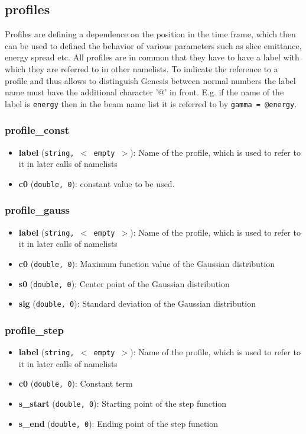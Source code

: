 \documentclass[12pt]{book}
\begin{document}
\subsection{\sf profiles}
Profiles are defining a dependence on the position in the time frame, which then can be used to defined the behavior of various parameters such as slice emittance, energy spread etc. All profiles are in common that they have to have a label with which they are referred to in other namelists. To indicate the reference to a profile and thus allows to distinguish Genesis between normal numbers the label name must have the additional character '@' in front. E.g. if the name of the label is {\tt energy} then in the beam name list it is referred to by {\tt gamma = @energy}.

\subsubsection{\sf profile\_const}
\begin{itemize}
\item{\bf label} ({\tt string, $<$ empty $>$}): Name of the profile, which is used to refer to it in later calls of namelists
\item{\bf c0} ({\tt double, 0}): constant value to be used.
\end{itemize}


\subsubsection{\sf profile\_gauss}
\begin{itemize}
\item{\bf label} ({\tt string, $<$ empty $>$}): Name of the profile, which is used to refer to it in later calls of namelists
\item{\bf c0} ({\tt double, 0}): Maximum function value of the Gaussian distribution
\item{\bf s0} ({\tt double, 0}): Center point of the Gaussian distribution
\item{\bf sig} ({\tt double, 0}): Standard deviation of the Gaussian distribution
\end{itemize}
\subsubsection{\sf profile\_step}
\begin{itemize}
\item{\bf label} ({\tt string, $<$ empty $>$}): Name of the profile, which is used to refer to it in later calls of namelists
\item{\bf c0} ({\tt double, 0}): Constant term
\item{\bf s\_start} ({\tt double, 0}): Starting point of the step function
\item{\bf s\_end} ({\tt double, 0}): Ending point of the step function
\end{itemize}
\end{document}
